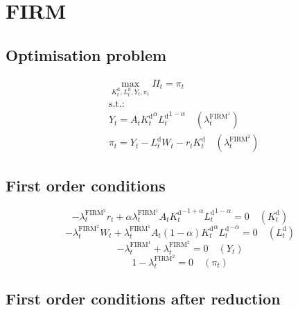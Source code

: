 \section{FIRM}

\subsection{Optimisation problem}

\begin{align}
&\max_{K^{\mathrm{d}}_{t}, L^{\mathrm{d}}_{t}, Y_{t}, \pi_{t}
} \Pi_{t} = \pi_{t}\\
&\mathrm{s.t.:}\nonumber\\
& Y_{t} = {A_{t}} {{K^{\mathrm{d}}_{t}}^{\alpha}} {{L^{\mathrm{d}}_{t}}^{1 - \alpha}} \quad \left(\lambda^{\mathrm{FIRM}^{\mathrm{1}}}_{t}\right)\\
& \pi_{t} = Y_{t} - {L^{\mathrm{d}}_{t}} {W_{t}} - {r_{t}} {K^{\mathrm{d}}_{t}} \quad \left(\lambda^{\mathrm{FIRM}^{\mathrm{2}}}_{t}\right)
\end{align}


\subsection{First order conditions}

\begin{equation}
-{\lambda^{\mathrm{FIRM}^{\mathrm{2}}}_{t}} {r_{t}} + {\alpha} {\lambda^{\mathrm{FIRM}^{\mathrm{1}}}_{t}} {A_{t}} {{K^{\mathrm{d}}_{t}}^{-1 + \alpha}} {{L^{\mathrm{d}}_{t}}^{1 - \alpha}} = 0
 \quad \left(K^{\mathrm{d}}_{t}\right)
\end{equation}
\begin{equation}
-{\lambda^{\mathrm{FIRM}^{\mathrm{2}}}_{t}} {W_{t}} + {\lambda^{\mathrm{FIRM}^{\mathrm{1}}}_{t}} {A_{t}} \left(1 - \alpha\right) {{K^{\mathrm{d}}_{t}}^{\alpha}} {{L^{\mathrm{d}}_{t}}^{-\alpha}} = 0
 \quad \left(L^{\mathrm{d}}_{t}\right)
\end{equation}
\begin{equation}
-\lambda^{\mathrm{FIRM}^{\mathrm{1}}}_{t} + \lambda^{\mathrm{FIRM}^{\mathrm{2}}}_{t} = 0
 \quad \left(Y_{t}\right)
\end{equation}
\begin{equation}
1 - \lambda^{\mathrm{FIRM}^{\mathrm{2}}}_{t} = 0
 \quad \left(\pi_{t}\right)
\end{equation}


\subsection{First order conditions after reduction}

